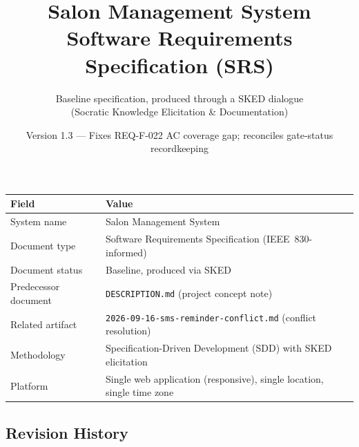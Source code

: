 \documentclass[11pt,a4paper]{article}
\title{
    Salon Management System\\[0.5em]
    \large Software Requirements Specification (SRS)
}
\author{
    Baseline specification, produced through a SKED dialogue\\
    (Socratic Knowledge Elicitation \& Documentation)
}
\date{Version 1.3 --- Fixes REQ-F-022 AC coverage gap; reconciles gate-status recordkeeping}
\begin{document}
\maketitle

\begin{center}
\begin{tabularx}{0.9\textwidth}{@{}lX@{}}
\toprule
Field & Value \\
\midrule
System name & Salon Management System \\
Document type & Software Requirements Specification (IEEE~830-informed) \\
Document status & Baseline, produced via SKED \\
Predecessor document & \texttt{DESCRIPTION.md} (project concept note) \\
Related artifact & \texttt{2026-09-16-sms-reminder-conflict.md} (conflict resolution) \\
Methodology & Specification-Driven Development (SDD) with SKED elicitation \\
Platform & Single web application (responsive), single location, single time zone \\
\bottomrule
\end{tabularx}
\end{center}

\subsection*{Revision History}
\end{document}
